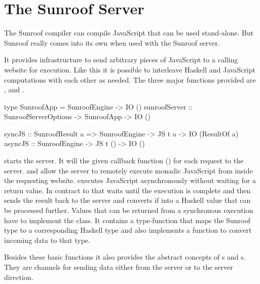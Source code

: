  
\section{The Sunroof Server}
\label{sec:server}

The Sunroof compiler can compile JavaScript that can be used
stand-alone. But Sunroof really comes
into its own when used with the Sunroof server.

It provides infrastructure to send arbitrary pieces 
of JavaScript to a calling website for execution. 
Like this it is possible to interleave Haskell and JavaScript 
computations with each other as needed. The three major functions
provided are ,  and .
\begin{Code}
type SunroofApp = SunroofEngine -> IO ()
sunroofServer :: SunroofServerOptions -> SunroofApp -> IO ()

syncJS  :: SunroofResult a 
        => SunroofEngine -> JS t a -> IO (ResultOf a)
asyncJS :: SunroofEngine -> JS t () -> IO ()
\end{Code}
 starts the server.
It will the given callback function () 
for each request to the server.
 and  allow the server
to remotely execute monadic JavaScript from inside the 
requesting website.
 executes JavaScript asynchronously without 
waiting for a return value. In contract to that 
 waits until the execution is complete and
then sends the result back to the server and converts if 
into a Haskell value that can be processed further. 
Values that can be returned from a synchronous execution 
have to implement the  class. It contains a type-function
 that maps the 
Sunroof type to a corresponding Haskell type and also 
implements a function to convert incoming data to that 
type.

Besides these basic functions it also provides the abstract 
concepts of s and s. They are 
channels for sending data either from the server or to
the server direction.

